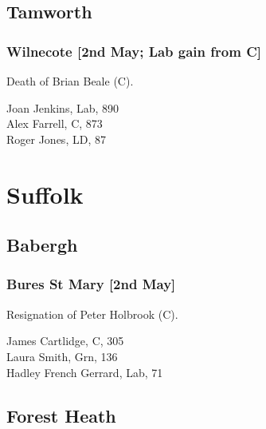\documentclass[a4paper,openany,10pt]{book}
\begin{document}
\subsection*{Tamworth}

\subsubsection*{Wilnecote \hspace*{\fill}\nolinebreak[1]%
\enspace\hspace*{\fill}
[2nd May; Lab gain from C]}


Death of Brian Beale (C).



Joan Jenkins, Lab, 890\\
Alex Farrell, C, 873\\
Roger Jones, LD, 87\\


\vfill

\section{Suffolk}

\subsection*{Babergh}

\subsubsection*{Bures St Mary \hspace*{\fill}\nolinebreak[1]%
\enspace\hspace*{\fill}
[2nd May]}


Resignation of Peter Holbrook (C).



James Cartlidge, C, 305\\
Laura Smith, Grn, 136\\
Hadley French Gerrard, Lab, 71\\


\subsection*{Forest Heath}
\end{document}
